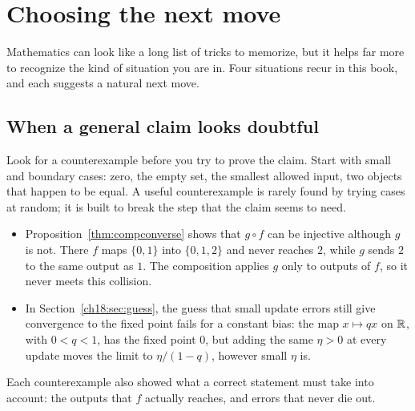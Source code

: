 \section{Choosing the next move}\label{appC:sec:next-move}
Mathematics can look like a long list of tricks to memorize, but it helps far more to recognize the kind of situation you are in. Four situations recur in this book, and each suggests a natural next move.

\subsection*{When a general claim looks doubtful}
Look for a counterexample before you try to prove the claim. Start with small and boundary cases: zero, the empty set, the smallest allowed input, two objects that happen to be equal. A useful counterexample is rarely found by trying cases at random; it is built to break the step that the claim seems to need.
\begin{itemize}
\item Proposition~\ref{thm:compconverse} shows that $g\circ f$ can be injective although $g$ is not. There $f$ maps $\{0,1\}$ into $\{0,1,2\}$ and never reaches $2$, while $g$ sends $2$ to the same output as $1$. The composition applies $g$ only to outputs of $f$, so it never meets this collision.
\item In Section~\ref{ch18:sec:guess}, the guess that small update errors still give convergence to the fixed point fails for a constant bias: the map $x\mapsto qx$ on $\mathbb R$, with $0<q<1$, has the fixed point $0$, but adding the same $\eta>0$ at every update moves the limit to $\eta/(1-q)$, however small $\eta$ is.
\end{itemize}
Each counterexample also showed what a correct statement must take into account: the outputs that $f$ actually reaches, and errors that never die out.


